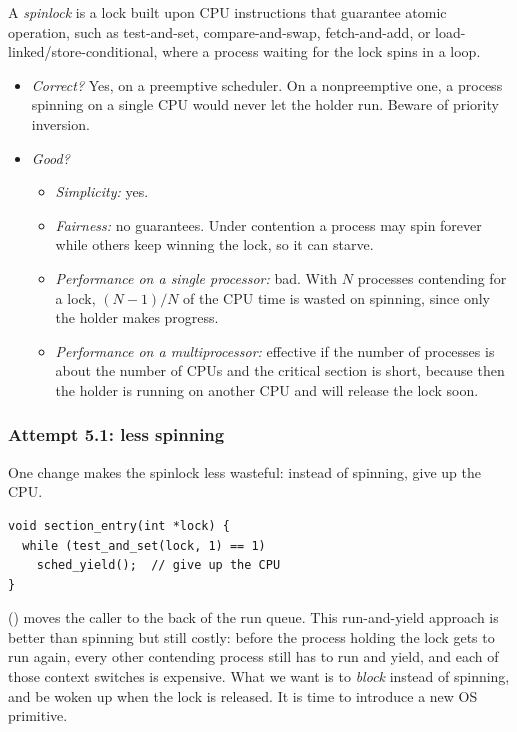 \begin{definition}[Spinlock]
  A \emph{spinlock} is a lock built upon CPU instructions that guarantee atomic operation, such as test-and-set, compare-and-swap, fetch-and-add, or load-linked/store-conditional, where a process waiting for the lock spins in a loop.
\end{definition}

\begin{itemize}
  \item \emph{Correct?} Yes, on a preemptive scheduler. On a nonpreemptive one, a process spinning on a single CPU would never let the holder run. Beware of priority inversion.
  \item \emph{Good?}
  \begin{itemize}
    \item \emph{Simplicity:} yes.
    \item \emph{Fairness:} no guarantees. Under contention a process may spin forever while others keep winning the lock, so it can starve.
    \item \emph{Performance on a single processor:} bad. With $N$ processes contending for a lock, $(N-1)/N$ of the CPU time is wasted on spinning, since only the holder makes progress.
    \item \emph{Performance on a multiprocessor:} effective if the number of processes is about the number of CPUs and the critical section is short, because then the holder is running on another CPU and will release the lock soon.
  \end{itemize}
\end{itemize}

\subsubsection{Attempt 5.1: less spinning}
One change makes the spinlock less wasteful: instead of spinning, give up the CPU.
\begin{lstlisting}
void section_entry(int *lock) {
  while (test_and_set(lock, 1) == 1)
    sched_yield();  // give up the CPU
}
\end{lstlisting}
 () moves the caller to the back of the run queue. This run-and-yield approach is better than spinning but still costly: before the process holding the lock gets to run again, every other contending process still has to run and yield, and each of those context switches is expensive. What we want is to \emph{block} instead of spinning, and be woken up when the lock is released. It is time to introduce a new OS primitive.

